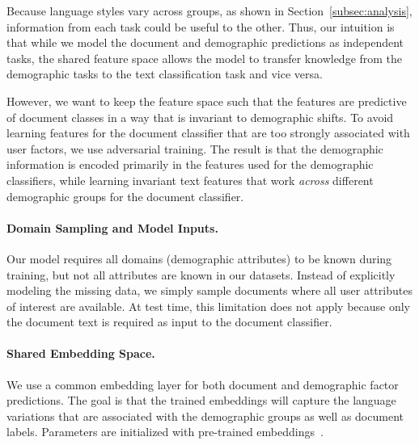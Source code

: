 Because language styles vary across groups, as shown in Section~\ref{subsec:analysis}, information from each task could be useful to the other.
Thus, our intuition is that while we model the document and demographic predictions as independent tasks, the shared feature space allows the model to transfer knowledge from the demographic tasks to the text classification task and vice versa. 

However, we want to keep the feature space such that
the features are predictive of document classes in a way that is invariant to demographic shifts. 
To avoid learning features for the document classifier that are too strongly associated with user factors, 
we use adversarial training.
The result is that the demographic information is encoded primarily in the features used for the demographic classifiers, while learning invariant text features that work {\em across} different demographic groups for the document classifier. 

\paragraph{Domain Sampling and Model Inputs.} 
Our model requires all domains (demographic attributes) to be known during training, but not all attributes are known in our datasets.
Instead of explicitly modeling the missing data,
we simply sample documents where all user attributes of interest are available.
At test time, this limitation does not apply because only the document text is required as input to the document classifier.


\paragraph{Shared Embedding Space.} We use a common embedding layer for both document and demographic factor predictions. The goal is that the trained embeddings will capture the language variations that are associated with the demographic groups as well as document labels. Parameters are initialized with pre-trained  embeddings~\cite{mikolov2013distributed, pennington2014glove}.

